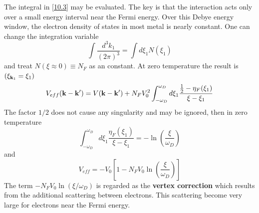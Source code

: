 The integral in \eqref{10.3} may be evaluated.
The key is that the interaction acts only over a small energy interval near the Fermi energy.
Over this Debye energy window, the electron density of states in most metal is nearly constant.
One can change the integration variable
\begin{equation}
    \int \frac{d^3k_1}{(2\pi)^3} = \int d\xi_1 N(\xi_1)
\end{equation}
and treat $N(\xi\approx 0) \equiv N_F$ as an constant. At zero temperature the result is $(\xi_{\mathbf{k}_1} = \xi_1)$
\begin{equation}
    V_{eff}(\mathbf{k}-\mathbf{k}') = V(\mathbf{k}-\mathbf{k}') + N_F V_0^2 \int_{-\omega_D}^{\omega_D} d\xi_1 \frac{\frac{1}{2} - \eta_F(\xi_1)}{\xi-\xi_1} \label{10.4}
\end{equation}
The factor $1/2$ does not cause any singularity and may be ignored, then in zero temperature
\begin{equation}
    \int_{-\omega_D}^{\omega_D} d\xi_1 \frac{\eta_F(\xi_1)}{\xi-\xi_1} = -\ln \left( \frac{\xi}{\omega_D}  \right) \label{10.5}
\end{equation}
and
\begin{equation}
    V_{eff} = -V_0 \left[ 1- N_F V_0 \ln\left( \frac{\xi}{\omega_D} \right) \right] \label{10.6}
\end{equation}
The term $-N_F V_0 \ln (\xi/\omega_D)$ is regarded as the \textbf{vertex correction} which results from the additional scattering between electrons.
This scattering become very large for electrons near the Fermi energy.

